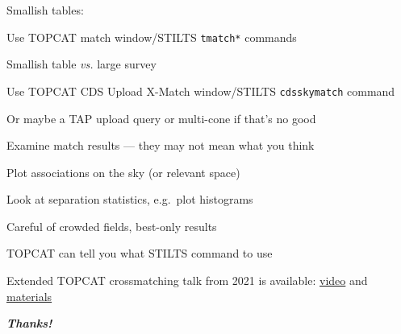 \documentclass[20pt,landscape]{foils}
\newcommand{\bhref}[2]{\href{#1}{{\color{blue}#2}}}
\begin{document}
\begin{list0}
  \item Smallish tables:
  \begin{list2big}
    \item Use TOPCAT match window/STILTS {\color{brown}\tt tmatch*} commands
  \end{list2big}
  \item Smallish table {\sl vs.\/} large survey
  \begin{list2big}
    \item Use TOPCAT CDS Upload X-Match window/STILTS {\color{brown}\tt cdsskymatch} command
    \item Or maybe a TAP upload query or multi-cone if that's no good
  \end{list2big}
  \item Examine match results --- they may not mean what you think
  \begin{list2big}
    \item Plot associations on the sky (or relevant space)
    \item Look at separation statistics, e.g.\ plot histograms
    \item Careful of crowded fields, best-only results
  \end{list2big}
  \item TOPCAT can tell you what STILTS command to use
  \item Extended TOPCAT crossmatching talk from 2021 is available:
        \bhref{https://youtu.be/mdMtmy3Zq-Q&t=3582s}{video} and
        \bhref{https://www.star.bristol.ac.uk/mbt/talks/shristi2021/}{materials}
\end{list0}

\vspace{0.2cm}
\begin{center}
  {\color{darkred}\Huge\bf\sl Thanks!}
\end{center}

\label{lastPage}
\end{document}
